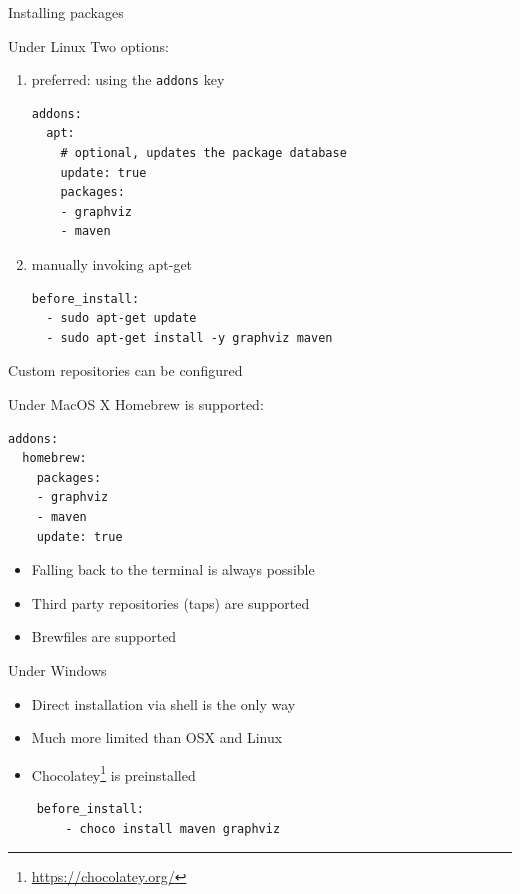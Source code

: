 \documentclass[presentation]{beamer}
\begin{document}
\begin{frame}{Installing packages}
    \begin{block}{Under Linux}
        Two options:
        \begin{enumerate}
            \item preferred: using the \texttt{addons} key
            \begin{verbatim}
addons:
  apt:
    # optional, updates the package database
    update: true
    packages:
    - graphviz
    - maven
            \end{verbatim}
        \item manually invoking apt-get
            \begin{verbatim}
before_install:
  - sudo apt-get update
  - sudo apt-get install -y graphviz maven
            \end{verbatim}
        \end{enumerate}
    Custom repositories can be configured
    \end{block}
    \begin{block}{Under MacOS X}
        Homebrew is supported:
        \begin{verbatim}
addons:
  homebrew:
    packages:
    - graphviz
    - maven
    update: true
        \end{verbatim}
        \begin{itemize}
            \item Falling back to the terminal is always possible
            \item Third party repositories (taps) are supported
            \item Brewfiles are supported
        \end{itemize}
    \end{block}
    \begin{block}{Under Windows}
        \begin{itemize}
            \item Direct installation via shell is the only way
            \item Much more limited than OSX and Linux
            \item Chocolatey\footnote{\url{https://chocolatey.org/}} is preinstalled
        \end{itemize}
        \begin{verbatim}
    before_install:
        - choco install maven graphviz
        \end{verbatim}
    \end{block}
\end{frame}
\end{document}

